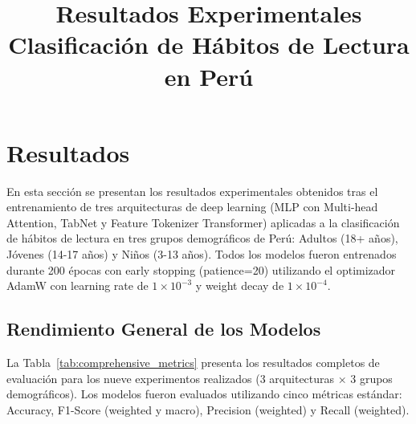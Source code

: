 \documentclass[12pt,a4paper]{article}
\title{Resultados Experimentales\\Clasificación de Hábitos de Lectura en Perú}
\author{}
\date{}
\begin{document}
\maketitle


\section{Resultados}

En esta sección se presentan los resultados experimentales obtenidos tras el entrenamiento de tres arquitecturas de deep learning (MLP con Multi-head Attention, TabNet y Feature Tokenizer Transformer) aplicadas a la clasificación de hábitos de lectura en tres grupos demográficos de Perú: Adultos (18+ años), Jóvenes (14-17 años) y Niños (3-13 años). Todos los modelos fueron entrenados durante 200 épocas con early stopping (patience=20) utilizando el optimizador AdamW con learning rate de $1 \times 10^{-3}$ y weight decay de $1 \times 10^{-4}$.

\subsection{Rendimiento General de los Modelos}

La Tabla~\ref{tab:comprehensive_metrics} presenta los resultados completos de evaluación para los nueve experimentos realizados (3 arquitecturas × 3 grupos demográficos). Los modelos fueron evaluados utilizando cinco métricas estándar: Accuracy, F1-Score (weighted y macro), Precision (weighted) y Recall (weighted).

\end{document}
